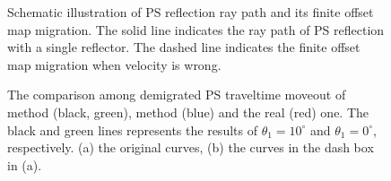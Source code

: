 \documentclass[extra,mreferee]{gji}
\newcommand{\Rome}[1]{{\bf\uppercase\expandafter{\romannumeral #1\relax}}}
\begin{document}
\begin{figure}
   \centering
   \caption{Schematic illustration of PS reflection ray path and its finite offset map
   migration. The solid line indicates the ray path of PS
   reflection with a single reflector. The dashed line indicates the finite offset map migration when velocity is wrong.}
   \label{fig:PS_refl}
\end{figure}
\begin{figure}
   \centering
   \caption{The comparison among demigrated PS traveltime moveout of method \Rome{1}
   (black, green), method 
   \Rome{2} (blue) and the real (red) one.
   The black and green lines represents the results of $\theta_1=10^{\circ}$ and
   $\theta_1=0^{\circ}$, respectively.
   (a) the original curves, (b) the curves in the dash box in (a).}
   \label{fig:Sens_vp}
\end{figure}
\end{document}
